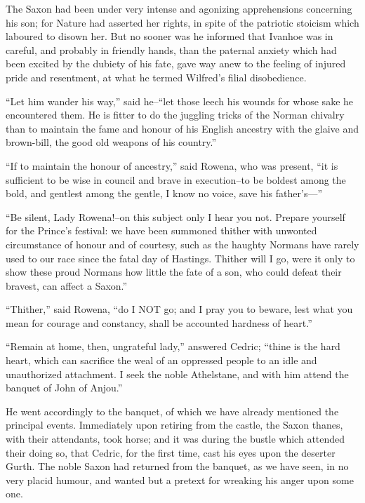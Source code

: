 The Saxon had been under very intense and agonizing apprehensions
concerning his son; for Nature had asserted her rights, in spite of the
patriotic stoicism which laboured to disown her. But no sooner was he
informed that Ivanhoe was in careful, and probably in friendly hands,
than the paternal anxiety which had been excited by the dubiety of his
fate, gave way anew to the feeling of injured pride and resentment, at
what he termed Wilfred's filial disobedience.

``Let him wander his way,'' said he--``let those leech his wounds for
whose sake he encountered them. He is fitter to do the juggling tricks
of the Norman chivalry than to maintain the fame and honour of his
English ancestry with the glaive and brown-bill, the good old weapons of
his country.''

``If to maintain the honour of ancestry,'' said Rowena, who was present,
``it is sufficient to be wise in council and brave in execution--to be
boldest among the bold, and gentlest among the gentle, I know no voice,
save his father's---''

``Be silent, Lady Rowena!--on this subject only I hear you not. Prepare
yourself for the Prince's festival: we have been summoned thither with
unwonted circumstance of honour and of courtesy, such as the haughty
Normans have rarely used to our race since the fatal day of Hastings.
Thither will I go, were it only to show these proud Normans how little
the fate of a son, who could defeat their bravest, can affect a Saxon.''

``Thither,'' said Rowena, ``do I NOT go; and I pray you to beware, lest
what you mean for courage and constancy, shall be accounted hardness of
heart.''

``Remain at home, then, ungrateful lady,'' answered Cedric; ``thine is
the hard heart, which can sacrifice the weal of an oppressed people to
an idle and unauthorized attachment. I seek the noble Athelstane, and
with him attend the banquet of John of Anjou.''

He went accordingly to the banquet, of which we have already mentioned
the principal events. Immediately upon retiring from the castle, the
Saxon thanes, with their attendants, took horse; and it was during the
bustle which attended their doing so, that Cedric, for the first time,
cast his eyes upon the deserter Gurth. The noble Saxon had returned from
the banquet, as we have seen, in no very placid humour, and wanted but a
pretext for wreaking his anger upon some one.

